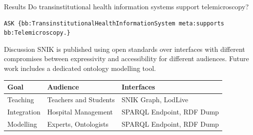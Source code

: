 \documentclass[portrait,final,a0paper,fontscale=0.310]{baposter}
\begin{document}
\begin{poster}
\begin{posterbox}[name=results,column=1]{Results}
Do transinstitutional health information systems support telemicroscopy?
\begin{lstlisting}
ASK {bb:TransinstitutionalHealthInformationSystem meta:supports bb:Telemicroscopy.}
\end{lstlisting}
\vspace{0.0em}

\end{posterbox}
\begin{posterbox}[name=discussion,column=1,below=results]{Discussion}
SNIK is published using open standards over interfaces with different compromises between expressivity and accessibility for different audiences.
Future work includes a dedicated ontology modelling tool.
\begin{center}
\begin{tabulary}{\textwidth}{lll}
\toprule
\textbf{Goal}		&\textbf{Audience}		&\textbf{Interfaces}\\
\midrule
Teaching	&Teachers and Students		&SNIK Graph, LodLive\\
Integration	&Hospital Management		&SPARQL Endpoint, RDF Dump\\
Modelling	&Experts, Ontologists		&SPARQL Endpoint, RDF Dump\\
\bottomrule
\end{tabulary}
\end{center}

\begin{tabulary}{\columnwidth}{lL}
\toprule
\bottomrule
\end{tabulary}%


\end{posterbox}
\end{poster}
\end{document}
